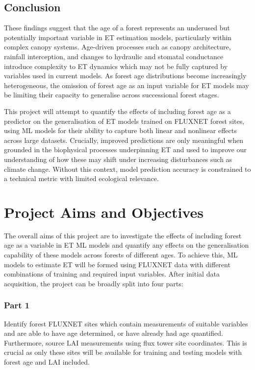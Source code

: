 \subsection{Conclusion}
These findings suggest that the age of a forest represents an underused but potentially important variable in ET estimation models, particularly within complex canopy systems. Age-driven processes such as canopy architecture, rainfall interception, and changes to hydraulic and stomatal conductance introduce complexity to ET dynamics which may not be fully captured by variables used in current models. As forest age distributions become increasingly heterogeneous, the omission of forest age as an input variable for ET models may be limiting their capacity to generalise across successional forest stages. 
\par This project will attempt to quantify the effects of including forest age as a predictor on the generalisation of ET models trained on FLUXNET forest sites, using ML models for their ability to capture both linear and nonlinear effects across large datasets. Crucially, improved predictions are only meaningful when grounded in the biophysical processes underpinning ET and used to improve our understanding of how these may shift under increasing disturbances such as climate change. Without this context, model prediction accuracy is constrained to a technical metric with limited ecological relevance.



\section{Project Aims and Objectives}
The overall aims of this project are to investigate the effects of including forest age as a variable in ET ML models and quantify any effects on the generalisation capability of these models across forests of different ages. To achieve this, ML models to estimate ET will be formed using FLUXNET data with different combinations of training and required input variables. After initial data acquisition, the project can be broadly split into four parts:

\subsubsection*{Part 1}
Identify forest FLUXNET sites which contain measurements of suitable variables and are able to have age determined, or have already had age quantified. Furthermore, source LAI measurements using flux tower site coordinates. This is crucial as only these sites will be available for training and testing models with forest age and LAI included.

